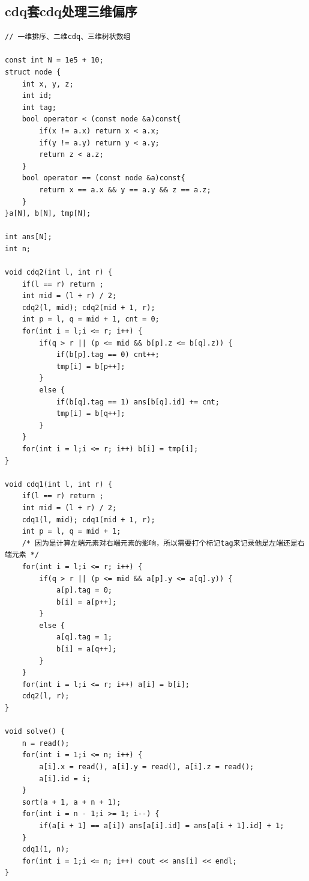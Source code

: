 \documentclass[twoside]{article}
\begin{document}
\subsection{cdq套cdq处理三维偏序}
\begin{lstlisting}
// 一维排序、二维cdq、三维树状数组

const int N = 1e5 + 10;
struct node {
    int x, y, z;
    int id;
    int tag;
    bool operator < (const node &a)const{
        if(x != a.x) return x < a.x;
        if(y != a.y) return y < a.y;
        return z < a.z;
    }
    bool operator == (const node &a)const{
        return x == a.x && y == a.y && z == a.z;
    }
}a[N], b[N], tmp[N];

int ans[N];
int n;

void cdq2(int l, int r) {
    if(l == r) return ;
    int mid = (l + r) / 2;
    cdq2(l, mid); cdq2(mid + 1, r);
    int p = l, q = mid + 1, cnt = 0;
    for(int i = l;i <= r; i++) {
        if(q > r || (p <= mid && b[p].z <= b[q].z)) {
            if(b[p].tag == 0) cnt++;
            tmp[i] = b[p++];
        }
        else {
            if(b[q].tag == 1) ans[b[q].id] += cnt;
            tmp[i] = b[q++];
        }
    }
    for(int i = l;i <= r; i++) b[i] = tmp[i];
}

void cdq1(int l, int r) {
    if(l == r) return ;
    int mid = (l + r) / 2;
    cdq1(l, mid); cdq1(mid + 1, r);
    int p = l, q = mid + 1;
    /* 因为是计算左端元素对右端元素的影响，所以需要打个标记tag来记录他是左端还是右端元素 */
    for(int i = l;i <= r; i++) {
        if(q > r || (p <= mid && a[p].y <= a[q].y)) {
            a[p].tag = 0;
            b[i] = a[p++];
        }
        else {
            a[q].tag = 1;
            b[i] = a[q++];
        }
    }
    for(int i = l;i <= r; i++) a[i] = b[i];
    cdq2(l, r);
}

void solve() {
    n = read();
    for(int i = 1;i <= n; i++) {
        a[i].x = read(), a[i].y = read(), a[i].z = read();
        a[i].id = i;
    }
    sort(a + 1, a + n + 1);
    for(int i = n - 1;i >= 1; i--) {
        if(a[i + 1] == a[i]) ans[a[i].id] = ans[a[i + 1].id] + 1;
    }
    cdq1(1, n);
    for(int i = 1;i <= n; i++) cout << ans[i] << endl;
}\end{lstlisting}
\end{document}
